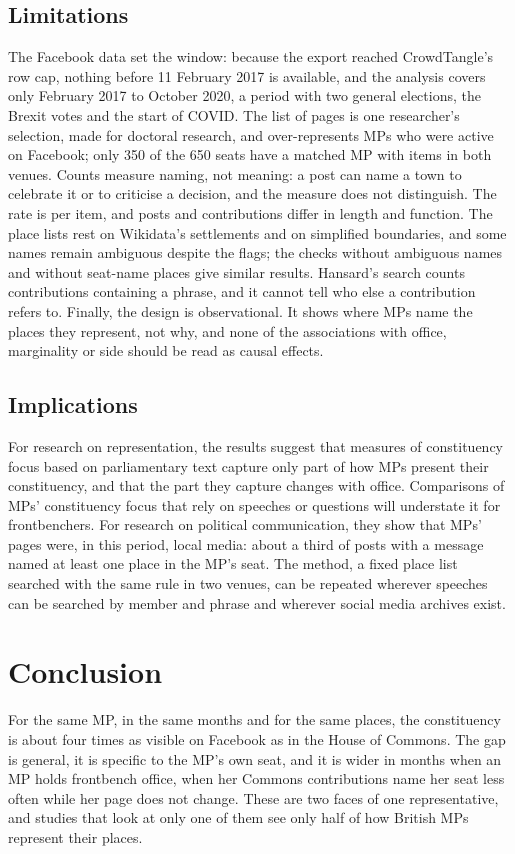 \documentclass[11pt,a4paper]{article}
\begin{document}
\subsection{Limitations}
The Facebook data set the window: because the export reached CrowdTangle's row cap, nothing before 11 February 2017 is available, and the analysis covers only February 2017 to October 2020, a period with two general elections, the Brexit votes and the start of COVID. The list of pages is one researcher's selection, made for doctoral research, and over-represents MPs who were active on Facebook; only 350 of the 650 seats have a matched MP with items in both venues. Counts measure naming, not meaning: a post can name a town to celebrate it or to criticise a decision, and the measure does not distinguish. The rate is per item, and posts and contributions differ in length and function. The place lists rest on Wikidata's settlements and on simplified boundaries, and some names remain ambiguous despite the flags; the checks without ambiguous names and without seat-name places give similar results. Hansard's search counts contributions containing a phrase, and it cannot tell who else a contribution refers to. Finally, the design is observational. It shows where MPs name the places they represent, not why, and none of the associations with office, marginality or side should be read as causal effects.

\subsection{Implications}
For research on representation, the results suggest that measures of constituency focus based on parliamentary text capture only part of how MPs present their constituency, and that the part they capture changes with office. Comparisons of MPs' constituency focus that rely on speeches or questions will understate it for frontbenchers. For research on political communication, they show that MPs' pages were, in this period, local media: about a third of posts with a message named at least one place in the MP's seat. The method, a fixed place list searched with the same rule in two venues, can be repeated wherever speeches can be searched by member and phrase and wherever social media archives exist.

\section{Conclusion}\label{sec:conc}
For the same MP, in the same months and for the same places, the constituency is about four times as visible on Facebook as in the House of Commons. The gap is general, it is specific to the MP's own seat, and it is wider in months when an MP holds frontbench office, when her Commons contributions name her seat less often while her page does not change. These are two faces of one representative, and studies that look at only one of them see only half of how British MPs represent their places.
\end{document}
